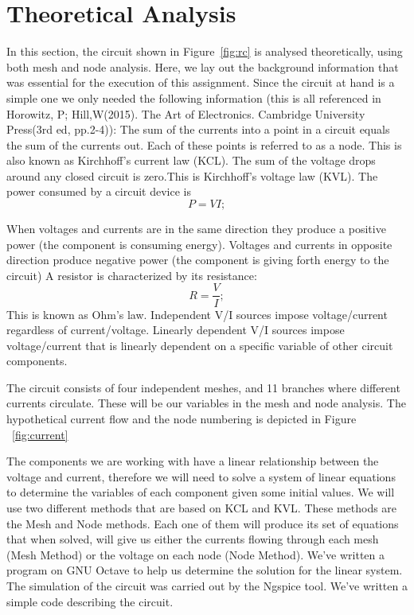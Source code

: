 \section{Theoretical Analysis}
\label{sec:analysis}

In this section, the circuit shown in Figure~\ref{fig:rc} is analysed
theoretically, using both mesh and node analysis.
Here, we lay out the background information that was essential for the execution of this assignment. Since the circuit at hand is a simple one we only needed the following information (this is all referenced in Horowitz, P; Hill,W(2015). The Art of Electronics. Cambridge University Press(3rd ed, pp.2-4)):
The sum of the currents into a point in a circuit equals the sum of the currents out. Each of these points is referred to as a node. This is also known as Kirchhoff’s current law (KCL).
The sum of the voltage drops around any closed circuit is zero.This is Kirchhoff’s voltage law (KVL).
The power consumed by a circuit device is
\begin{equation}
  P=VI;
\end{equation}

When voltages and currents are in the same direction they produce a positive power (the component is consuming energy). Voltages and currents in opposite direction produce negative power (the component is giving forth energy to the circuit)
A resistor is characterized by its resistance:
\begin{equation}
  R=\frac {V}{I};
\end{equation}
This is known as Ohm’s law.
Independent V/I sources impose voltage/current regardless of current/voltage.
Linearly dependent V/I sources impose voltage/current that is linearly dependent on a specific variable of other circuit components.

The circuit consists of four independent meshes, and 11 branches where different currents circulate. These will be our variables in the mesh and node analysis. The hypothetical current flow and the node numbering is depicted in Figure ~\ref{fig:current}


The components we are working with have a linear relationship between the voltage and current, therefore we will need to solve a system of linear equations to determine the variables of each component given some initial values.
We will use two different methods that are based on KCL and KVL. These methods are the Mesh and Node methods. Each one of them will produce its set of equations that when solved, will give us either the currents flowing through each mesh (Mesh Method) or the voltage on each node (Node Method).
We’ve written a program on GNU Octave to help us determine the solution for the linear system. The simulation of the circuit was carried out by the Ngspice tool. We’ve written a simple code describing the circuit.

